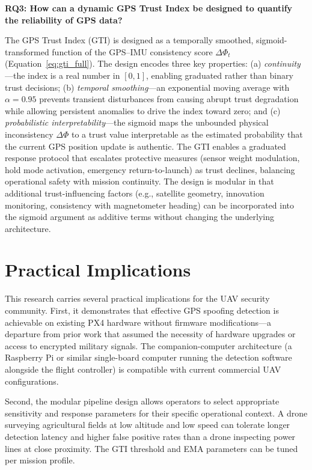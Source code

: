 \textbf{RQ3: How can a dynamic GPS Trust Index be designed to quantify the reliability of GPS data?}

The GPS Trust Index (GTI) is designed as a temporally smoothed, sigmoid-transformed function of the GPS--IMU consistency score \(\Delta \Phi_t\) (Equation~\ref{eq:gti_full}). The design encodes three key properties: (a) \textit{continuity}---the index is a real number in \([0, 1]\), enabling graduated rather than binary trust decisions; (b) \textit{temporal smoothing}---an exponential moving average with \(\alpha = 0.95\) prevents transient disturbances from causing abrupt trust degradation while allowing persistent anomalies to drive the index toward zero; and (c) \textit{probabilistic interpretability}---the sigmoid maps the unbounded physical inconsistency \(\Delta \Phi\) to a trust value interpretable as the estimated probability that the current GPS position update is authentic. The GTI enables a graduated response protocol that escalates protective measures (sensor weight modulation, hold mode activation, emergency return-to-launch) as trust declines, balancing operational safety with mission continuity. The design is modular in that additional trust-influencing factors (e.g., satellite geometry, innovation monitoring, consistency with magnetometer heading) can be incorporated into the sigmoid argument as additive terms without changing the underlying architecture.

\section{Practical Implications}

This research carries several practical implications for the UAV security community. First, it demonstrates that effective GPS spoofing detection is achievable on existing PX4 hardware without firmware modifications---a departure from prior work that assumed the necessity of hardware upgrades or access to encrypted military signals. The companion-computer architecture (a Raspberry Pi or similar single-board computer running the detection software alongside the flight controller) is compatible with current commercial UAV configurations.

Second, the modular pipeline design allows operators to select appropriate sensitivity and response parameters for their specific operational context. A drone surveying agricultural fields at low altitude and low speed can tolerate longer detection latency and higher false positive rates than a drone inspecting power lines at close proximity. The GTI threshold and EMA parameters can be tuned per mission profile.

